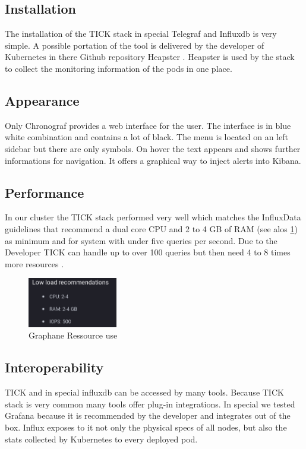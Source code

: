 \subsection{Installation}
The installation of the TICK stack in special Telegraf and Influxdb is very simple. A possible portation of the tool is delivered by the developer of Kubernetes in there Github repository Heapster \cite{heapster}. Heapster is used by the stack to collect the monitoring information of the pods in one place.
\subsection{Appearance}
Only Chronograf provides a web interface for the user. The interface is in blue white combination and contains a lot of black. The menu is located on an left sidebar but there are only symbols. On hover the text appears and shows further informations for navigation. It offers a graphical way to inject alerts into Kibana.

\subsection{Performance}
In our cluster the TICK stack performed very well which matches the InfluxData guidelines that recommend a dual core CPU and 2 to 4 GB of RAM (see alos \cref{fig:TICK_recommendet}) as minimum and for system with under five queries per second. Due to the Developer TICK can handle up to over 100 queries but then need 4 to 8 times more resources \cite{influx_require}.
\begin{figure}
\centering
\includegraphics[width=0.35\textwidth]{Bilder/Performance/TICK_recommendet}
\caption{Graphane Ressource use}
\label{fig:TICK_recommendet}
\end{figure}

\subsection{Interoperability}
TICK and in special influxdb can be accessed by many tools. Because TICK stack is very common many tools offer plug-in integrations. In special we tested Grafana because it is recommended by the developer and integrates out of the box. Influx exposes to it not only the physical specs of all nodes, but also the stats collected by Kubernetes to every deployed pod. 
